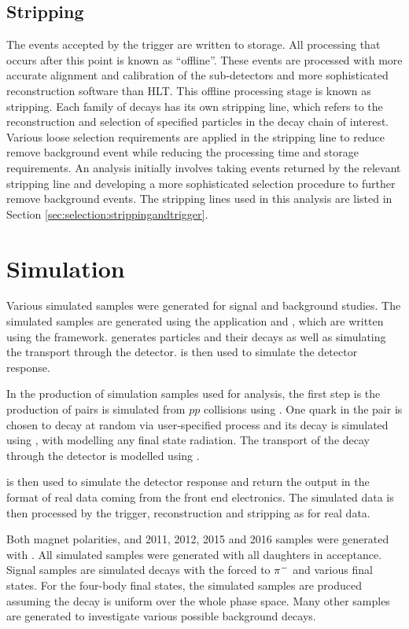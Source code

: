 \subsection{Stripping}
\label{sec:detector:stripping}

The events accepted by the trigger are written to storage. All processing that occurs after this point is known as ``offline''. These events are processed with more accurate alignment and calibration of the sub-detectors and more sophisticated reconstruction software than HLT. This offline processing stage is known as stripping. Each family of decays has its own stripping line, which refers to the reconstruction and selection of specified particles in the decay chain of interest. Various loose selection requirements are applied in the stripping line to reduce remove background event while reducing the processing time and storage requirements. An analysis initially involves taking events returned by the relevant stripping line and developing a more sophisticated selection procedure to further remove background events. The stripping lines used in this analysis are listed in Section \ref{sec:selection:strippingandtrigger}.

\section{Simulation}

Various simulated samples were generated for signal and background studies. The simulated samples are generated using the \lhcb application \gauss and \boole, which are written using the \gaudi framework. \gauss generates particles and their decays as well as simulating the transport through the detector. \boole is then used to simulate the detector response. 

In the production of simulation samples used for analysis, the first step is the production of \bquark\bquarkbar pairs is simulated from $pp$ collisions using \pythia. One quark in the \bquark\bquarkbar pair is chosen to decay at random via user-specified process and its decay is simulated using \evtgen, with \photos modelling any final state radiation. The transport of the decay through the detector is modelled using \geant. 

\boole is then used to simulate the detector response and return the output in the format of real data coming from the front end electronics. The simulated data is then processed by the trigger, reconstruction and stripping as for real data.

Both magnet polarities, and 2011, 2012, 2015 and 2016 samples were generated with . All simulated samples were generated with all daughters in \lhcb acceptance. Signal samples are simulated \btodkst decays with the \Kstarm forced to \KS${{\pi}^-}$ and various \D final states. For the four-body \D final states, the simulated samples are produced assuming the \D decay is uniform over the whole phase space. Many other samples are generated to investigate various possible background decays.
